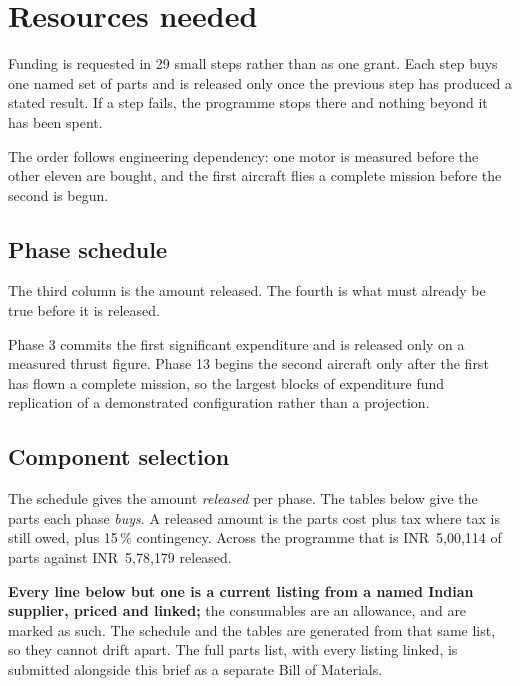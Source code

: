 \documentclass[11pt,a4paper]{article}
\newcommand{\rs}[1]{\mbox{INR~#1}}
\begin{document}
\section{Resources needed}

Funding is requested in 29 small steps rather than as one grant. Each step buys
one named set of parts and is released only once the previous step has produced
a stated result. If a step fails, the programme stops there and nothing beyond
it has been spent.

The order follows engineering dependency: one motor is measured before the other
eleven are bought, and the first aircraft flies a complete mission before the
second is begun.

\subsection{Phase schedule}

The third column is the amount released. The fourth is what must already be
true before it is released.



Phase 3 commits the first significant expenditure and is released only on a
measured thrust figure. Phase 13 begins the second aircraft only after the first
has flown a complete mission, so the largest blocks of expenditure fund
replication of a demonstrated configuration rather than a projection.

\subsection{Component selection}

The schedule gives the amount
\emph{released} per phase. The tables below give the parts each phase
\emph{buys}. A released amount is the parts cost plus tax where tax is still
owed, plus 15\,\% contingency. Across the programme that is \rs{5{,}00{,}114}
of parts against \rs{5{,}78{,}179} released.

\textbf{Every line below but one is a current listing from a named Indian
supplier, priced and linked;} the consumables are an allowance, and are marked
as such. The schedule and the tables are generated
from that same list, so they cannot drift apart. The full parts list, with every listing linked, is submitted alongside this brief as a separate Bill of Materials.
\end{document}

